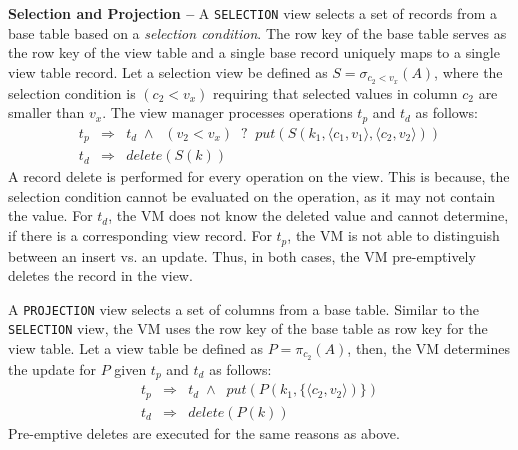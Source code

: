 \noindent  
\textbf{Selection and Projection --} A \texttt{SELECTION} view selects
a set of records from a base table based on a \textit{selection
  condition}.  The row key of the base table serves as the row key of
the view table and a single base record uniquely maps to a single view
table record.  Let a selection view be defined as $S=\sigma_{c_2 <
  v_x}(A)$, where the selection condition is $(c_2 < v_x)$ requiring
that selected values in column $c_2$ are smaller than $v_x$.  The view
manager processes operations $t_p$ and $t_d$ as follows:
%
\begin{eqnarray}
	t_p & \Rightarrow & t_d\;\land\;\;(v_2 < v_x)\;\; \texttt{?} \;\;put(S(k_1,\langle c_1,v_1\rangle, \langle c_2,v_2\rangle))\\
	t_d & \Rightarrow & delete(S(k))
\end{eqnarray}
%
A record delete is performed for every operation on the view.  This is
because, the selection condition cannot be evaluated on the operation,
as it may not contain the value.  For $t_d$, the VM does not know the
deleted value and cannot determine, if there is a corresponding view
record. For $t_p$, the VM is not able to distinguish between an insert
vs. an update.  Thus, in both cases, the VM pre-emptively deletes the
record in the view.

A \texttt{PROJECTION} view selects a set of columns from a base
table. Similar to the \texttt{SELECTION} view, the VM uses the row key
of the base table as row key for the view table.  Let a view table be
defined as $P=\pi_{c_2}(A)$, then, the VM determines the update for
$P$ given $t_p$ and $t_d$ as follows:
%
\begin{eqnarray}
	t_p & \Rightarrow & t_d\;\land\;\;put(P(k_1, \{\langle c_2,v_2\rangle)\})\\
	t_d & \Rightarrow & delete(P(k))
\end{eqnarray}
%
Pre-emptive deletes are executed for the same reasons as above.

